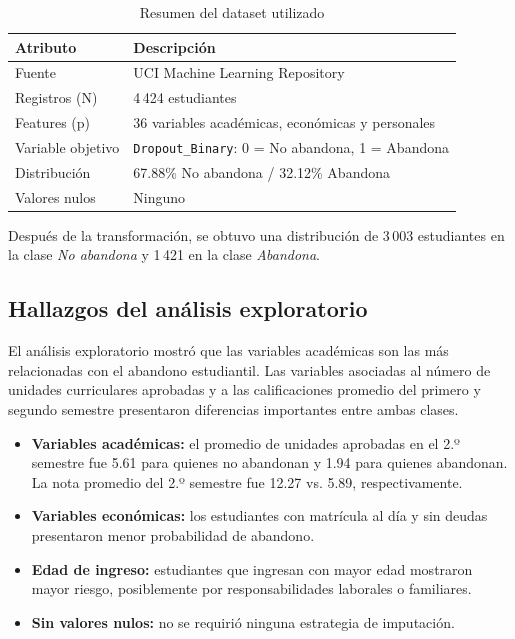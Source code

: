 \documentclass[10pt,twocolumn]{article}
\begin{document}
\begin{table}[H]
\centering
\caption{Resumen del dataset utilizado}
\label{tab:dataset}
\begin{tabularx}{\columnwidth}{lX}
\toprule
\textbf{Atributo} & \textbf{Descripción} \\
\midrule
Fuente & UCI Machine Learning Repository \\
Registros (N) & 4\,424 estudiantes \\
Features (p) & 36 variables académicas, económicas y personales \\
Variable objetivo & \texttt{Dropout\_Binary}: 0 = No abandona, 1 = Abandona \\
Distribución & 67.88\% No abandona / 32.12\% Abandona \\
Valores nulos & Ninguno \\
\bottomrule
\end{tabularx}
\end{table}

Después de la transformación, se obtuvo una distribución de 3\,003
estudiantes en la clase \textit{No abandona} y 1\,421 en la clase
\textit{Abandona}.

\subsection{Hallazgos del análisis exploratorio}

El análisis exploratorio mostró que las variables académicas son las más
relacionadas con el abandono estudiantil. Las variables asociadas al número
de unidades curriculares aprobadas y a las calificaciones promedio del
primero y segundo semestre presentaron diferencias importantes entre ambas
clases.

\begin{itemize}[leftmargin=*,topsep=2pt,itemsep=1pt]
  \item \textbf{Variables académicas:} el promedio de unidades aprobadas
        en el 2.º semestre fue 5.61 para quienes no abandonan y 1.94
        para quienes abandonan. La nota promedio del 2.º semestre fue
        12.27 vs. 5.89, respectivamente.
  \item \textbf{Variables económicas:} los estudiantes con matrícula al
        día y sin deudas presentaron menor probabilidad de abandono.
  \item \textbf{Edad de ingreso:} estudiantes que ingresan con mayor
        edad mostraron mayor riesgo, posiblemente por responsabilidades
        laborales o familiares.
  \item \textbf{Sin valores nulos:} no se requirió ninguna estrategia
        de imputación.
\end{itemize}
\end{document}
